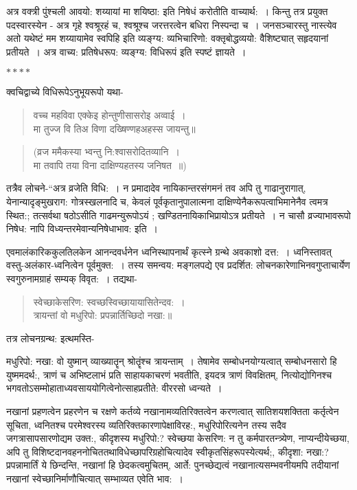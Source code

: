{अत्र वक्त्री पुंश्चली आवयो: शय्यायां मा शयिष्ठा: इति निषेधं करोतीति वाच्यार्थ:~। किन्तु तत्र प्रयुक्त पदस्वारस्येन - अत्र गृहे श्वश्रूरहं च, श्वश्रूश्च जरत्तरत्वेन बधिरा निस्पन्दा च~। जनसञ्चारस्तु नास्त्येव अतो यथेष्टं मम शय्यायामेव स्वपिहि इति व्यङ्ग्य: व्यभिचारिणो: वक्तृबोद्धव्ययो: वैशिष्ट्यात् सहृदयानां प्रतीयते~। अत्र वाच्य: प्रतिषेधरूप: व्यङ्ग्य: विधिरूपं इति स्पष्टं ज्ञायते~। 

$****$

क्वचिद्वाच्ये विधिरूपेऽनुभूयरूपो यथा-
\begin{verse}
वच्च महविवा एक्केइ होन्तुणीसासरोइ अव्वाई~। \\
मा तुज्ज वि तिअ विणा दख्षिण्णहअहस्स जायन्तु॥
\end{verse}
\begin{verse}
(व्रज ममैकस्या भ्वन्तु नि:श्वासरोदितव्यानि~। \\
मा तवापि तया विना दाक्षिण्यहतस्य जनिषत~॥)
\end{verse}
तत्रैव लोचने-“अत्र व्रजेति विधि:~। न प्रमादादेव नायिकान्तरसंगमनं तव अपि तु गाढानुरागात्, येनान्यादृङ्मुखराग: गोत्रस्खलनादि च, केवलं पूर्वकृतानुपालात्मना दाक्षिण्येनैकरूपत्वाभिमानेनैव त्वमत्र स्थित:; तत्सर्वथा षठोऽसीति गाढमन्युरूपोऽयं ; खण्डितनायिकाभिप्रायोऽत्र प्रतीयते~। न चासौ व्रज्याभावरूपो निषेध: नापि विध्यन्तरमेवान्यनिषेधाभाव: इति~। 

एवमालंकारिककुलतिलकेन आनन्दवर्धनेन ध्वनिस्थापनार्थं कृत्स्ने ग्रन्थे अवकाशो दत्त:~। ध्वनिस्तावत् वस्तु-अलंकार-ध्वनित्वेन पूर्वमुक्त:~। तस्य समन्वय: मङ्गलपद्ये एव प्रदर्शित: लोचनकारेणाभिनवगुप्ताचार्येण स्वगुरुनामग्राहं सम्यक् विवृत:~। तद्यथा-
\begin{verse}
स्वेच्छाकेसरिण: स्वच्छस्विच्छायायासितेन्दव:~। \\
त्रायन्तां वो मधुरिपो: प्रपन्नार्तिच्छिदो नखा:॥
\end{verse}
तत्र लोचनग्रन्थ: इत्थमस्ति-

मधुरिपो: नखा: वो युष्मान् व्याख्यातॄन् श्रोतॄंश्च त्रायन्ताम्~। तेषामेव सम्बोधनयोग्यत्वात् सम्बोधनसारो हि युष्ममदर्थ:, त्राणं च अभिष्टलाभं प्रति साहायकाचरणं भवतीति, इयदत्र त्राणं विवक्षितम्, नित्योद्योगिनश्च भगवतोऽसम्मोहाताध्यवसाययोगित्वेनोत्साहप्रतीते: वीररसो ध्वन्यते~। 

नखानां प्रहणत्वेन प्रहरणेन च रक्षणे कर्तव्ये नखानामव्यतिरिक्तत्वेन करणत्वात् सातिशयशक्तिता कर्तृत्वेन सूचिता, ध्वनितश्च परमेश्वरस्य व्यतिरिक्तकारणापेक्षाविरह:, मधुरिपोरित्यनेन तस्य सदैव जगत्रासापसारणोद्यम उक्त:, कीदृशस्य मधुरिपो:? स्वेच्छया केसरिण: न तु कर्मपारतन्त्र्येण, नाप्यन्दीयेच्छया, अपि तु विशिष्टदानवहननोचिततथाविधेच्छापरिग्रहोचित्यादेव स्वीकृतसिंहरूपस्येत्यर्थ;, कीदृशा: नखा:? प्रपन्नामार्तिं ये छिन्दन्ति, नखानां हि छेदकत्वमुचितम्, आर्ते: पुनच्छेद्यत्वं नखानात्यसम्भवनीयमपि तदीयानां नखानां स्वेच्छानिर्माणौचित्यात् सम्भाव्यत एवेति भाव:~। 

}
